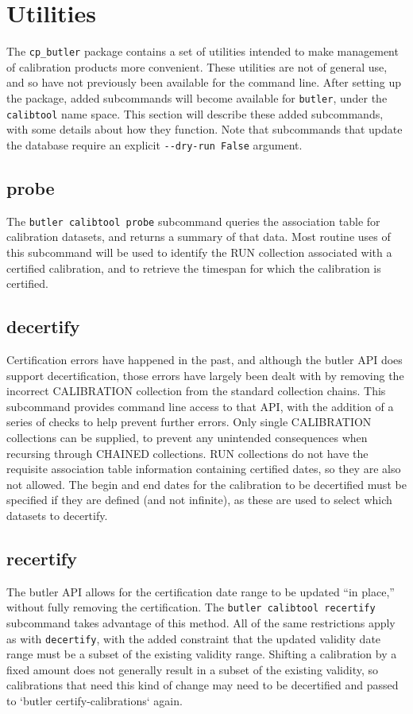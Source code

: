 \documentclass[DM,authoryear,toc]{lsstdoc}
\begin{document}
\section{Utilities}

The \verb|cp_butler| package contains a set of utilities intended to make management of calibration products more convenient.
These utilities are not of general use, and so have not previously been available for the command line.
After setting up the package, added subcommands will become available for \verb|butler|, under the \verb|calibtool| name space.
This section will describe these added subcommands, with some details about how they function.
Note that subcommands that update the database require an explicit \verb|--dry-run False| argument.


\subsection{probe}
The \verb|butler calibtool probe| subcommand queries the association table for calibration datasets, and returns a summary of that data.
Most routine uses of this subcommand will be used to identify the RUN collection associated with a certified calibration, and to retrieve the timespan for which the calibration is certified.

\subsection{decertify}
Certification errors have happened in the past, and although the butler API does support decertification, those errors have largely been dealt with by removing the incorrect CALIBRATION collection from the standard collection chains.
This subcommand provides command line access to that API, with the addition of a series of checks to help prevent further errors.
Only single CALIBRATION collections can be supplied, to prevent any unintended consequences when recursing through CHAINED collections.
RUN collections do not have the requisite association table information containing certified dates, so they are also not allowed.
The begin and end dates for the calibration to be decertified must be specified if they are defined (and not infinite), as these are used to select which datasets to decertify.

\subsection{recertify}
The butler API allows for the certification date range to be updated ``in place,'' without fully removing the certification.
The \verb|butler calibtool recertify| subcommand takes advantage of this method.
All of the same restrictions apply as with \verb|decertify|, with the added constraint that the updated validity date range must be a subset of the existing validity range.
Shifting a calibration by a fixed amount does not generally result in a subset of the existing validity, so calibrations that need this kind of change may need to be decertified and passed to `butler certify-calibrations` again.
\end{document}
